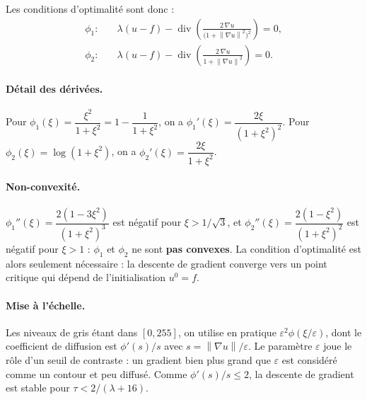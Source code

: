 \documentclass[11pt,a4paper]{article}
\newcommand{\nr}[1]{\left\| #1 \right\|}
\newcommand{\dive}{\operatorname{div}}
\begin{document}
Les conditions d'optimalité sont donc :
\begin{align*}
  \phi_1 :\quad & \lambda(u-f) - \dive\!\left(\frac{2\,\nabla u}{\big(1+\nr{\nabla u}^2\big)^2}\right) = 0, \\
  \phi_2 :\quad & \lambda(u-f) - \dive\!\left(\frac{2\,\nabla u}{1+\nr{\nabla u}^2}\right) = 0 .
\end{align*}

\paragraph{Détail des dérivées.}
Pour $\phi_1(\xi) = \dfrac{\xi^2}{1+\xi^2} = 1 - \dfrac{1}{1+\xi^2}$, on a $\phi_1'(\xi) = \dfrac{2\xi}{(1+\xi^2)^2}$.
Pour $\phi_2(\xi)=\log(1+\xi^2)$, on a $\phi_2'(\xi) = \dfrac{2\xi}{1+\xi^2}$.

\paragraph{Non-convexité.}
$\phi_1''(\xi) = \dfrac{2(1-3\xi^2)}{(1+\xi^2)^3}$ est négatif pour $\xi > 1/\sqrt3$, et
$\phi_2''(\xi) = \dfrac{2(1-\xi^2)}{(1+\xi^2)^2}$ est négatif pour $\xi>1$ :
$\phi_1$ et $\phi_2$ ne sont \textbf{pas convexes}. La condition d'optimalité est alors seulement nécessaire :
la descente de gradient converge vers un point critique qui dépend de l'initialisation $u^0=f$.

\paragraph{Mise à l'échelle.}
Les niveaux de gris étant dans $[0,255]$, on utilise en pratique $\varepsilon^2\phi(\xi/\varepsilon)$, dont
le coefficient de diffusion est $\phi'(s)/s$ avec $s = \nr{\nabla u}/\varepsilon$. Le paramètre $\varepsilon$
joue le rôle d'un seuil de contraste : un gradient bien plus grand que $\varepsilon$ est considéré comme un contour
et peu diffusé. Comme $\phi'(s)/s \le 2$, la descente de gradient est stable pour $\tau < 2/(\lambda+16)$.
\end{document}

